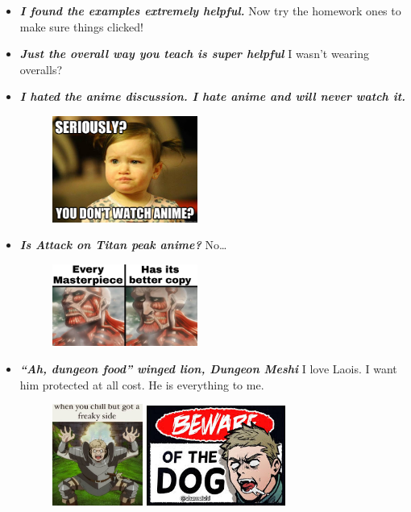 \documentclass[11pt,letterpaper]{article}
\begin{document}
\begin{itemize}
\item {\bfseries\itshape I found the examples extremely helpful.} Now try the homework ones to make sure things clicked!

\item {\bfseries\itshape Just the overall way you teach is super helpful} I wasn't wearing overalls? 

\item {\bfseries\itshape I hated the anime discussion. I hate anime and will never watch it.} 
	\begin{figure}[H]
	\centering
	\includegraphics[width=0.45\textwidth]{images/anime3.jpg}
	\end{figure}

\item {\bfseries\itshape Is Attack on Titan peak anime?} No\dots
	\begin{figure}[H]
	\centering
	\includegraphics[width=0.45\textwidth]{images/anime4.jpg}
	\end{figure}

\newpage

\item {\bfseries\itshape ``Ah, dungeon food'' winged lion, Dungeon Meshi} I love Laois. I want him protected at all cost. He is everything to me. 
	\begin{figure}[H]
	\centering
	\includegraphics[width=0.28\textwidth]{images/laois.jpg}
	\includegraphics[width=0.43\textwidth]{images/laois2.jpeg}
	\end{figure}


\end{itemize}
\end{document}
